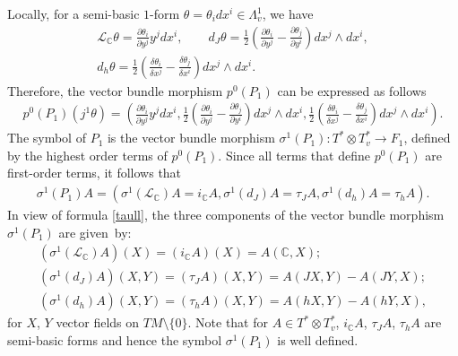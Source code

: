 \documentclass[pdftex]{sigma}
\numberwithin{equation}{section}
\begin{document}
Locally, for a semi-basic $1$-form $\theta=\theta_idx^i\in
\Lambda^1_v$, we have
\begin{gather*}
\mathcal{L}_{\mathbb C}\theta=\frac{\partial \theta_i}{\partial
  y^j}y^jdx^i, \qquad d_J\theta = \frac{1}{2}\left(\frac{\partial
\theta_i}{\partial y^j}-\frac{\partial \theta_j}{\partial
y^i}\right)dx^j\wedge dx^i, \\ d_h\theta = \frac{1}{2}\left(\frac{\delta \theta_i}{\delta x^j}-
\frac{\delta \theta_j}{\delta x^i} \right) dx^j\wedge dx^i.
\end{gather*}
Therefore, the vector bundle morphism $p^0(P_1)$ can be expressed as
follows
\begin{gather*}
p^0(P_1)(j^1\theta)= \left(\frac{\partial
\theta_i}{\partial y^j}y^j dx^i, \frac{1}{2}\left(\frac{\partial
\theta_i}{\partial y^j}-\frac{\partial \theta_j}{\partial
y^i}\right) dx^j\wedge dx^i, \frac{1}{2}\left(\frac{\delta \theta_i}{\delta x^j}-
\frac{\delta \theta_j}{\delta x^i}\right) dx^j\wedge dx^i \right).
\end{gather*} The symbol
of $P_1$ is the vector bundle morphism $\sigma^1(P_1): T^*\otimes
T^*_v \to F_1$, def\/ined by the highest order terms of $p^0(P_1)$.
Since all terms that def\/ine $p^0(P_1)$ are f\/irst-order terms,
it follows that
\begin{gather} \sigma^1(P_1)A=\left(
\sigma^1\left(\mathcal{L}_{\mathbb C}\right)A=i_{\mathbb{C}}A,
\sigma^1\left(d_J\right)A=\tau_JA,
\sigma^1\left(d_h\right)A=\tau_hA\right). \label{sigma1p1}
\end{gather}
In view of formula \eqref{taull}, the three components of the vector
bundle morphism $\sigma^1(P_1)$ are given~by:
\begin{gather*}
\left( \sigma^1\left(\mathcal{L}_{\mathbb C}\right)A\right) (X)
 = \left( i_{\mathbb{C}}A\right)(X)=A(\mathbb{C}, X); \\
\left(\sigma^1\left(d_J\right)A\right)(X,Y) = \left(\tau_JA\right)(X,Y)
= A(JX,Y)-A(JY, X); \\
\left(\sigma^1\left(d_h\right)A\right)(X,Y) = \left(\tau_hA\right)(X,Y)
= A(hX,Y)-A(hY, X),
\end{gather*} for $X$, $Y$ vector f\/ields on $TM\setminus\{0\}$.
Note that for $A\in T^*\otimes T^*_v$, $i_{\mathbb{C}}A$, $\tau_JA$,
$\tau_hA$ are semi-basic forms and hence the symbol $\sigma^1(P_1)$ is well
def\/ined.
\end{document}
